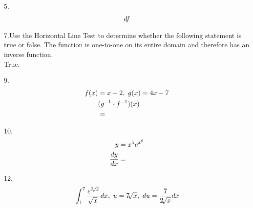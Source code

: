 \documentclass[11pt]{article}
\newcommand*{\set}{\setcounter{equation}{0}}
\begin{document}
5.\begin{align}
    \set
    df
\end{align}

7.Use the Horizontal Line Test to determine whether the following statement is true or false.
The function is one-to-one on its entire domain and therefore has an inverse function.\\
\indent True.

9.\begin{align}
    \set
    f(x)&=x+2,\,\, g(x)=4x-7\\
    &(g^{-1}\cdot f^{-1})(x)\\
    &=
\end{align}

10.\begin{align}
    \set
    y&=x^5e^{x^9}\\
    \frac{dy}{dx}&=
\end{align}

12.\begin{align}
    \set
    &\int_{1}^{7}\frac{e^{7\sqrt[]{x}}}{\sqrt[]{x}}dx,\,\, u=7\sqrt[]{x},\,\, du=\frac{7}{2\sqrt[]{x}}dx\\
\end{align}
\end{document}
